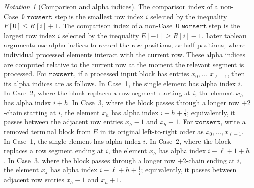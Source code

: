 \documentclass[11pt]{article}
\theoremstyle{plain}
\theoremstyle{definition}
\theoremstyle{remark}
\newtheorem*{notation}{Notation}
\newcommand{\rowsert}{\texttt{rowsert}}
\newcommand{\worsert}{\texttt{worsert}}
\begin{document}
\begin{notation}[Comparison and alpha indices]
The comparison index of a non-Case~0 \(\rowsert\) step is the smallest row
index \(i\) selected by the inequality \(F[0]\le R[i]+1\).  The comparison index
of a non-Case~0 \(\worsert\) step is the largest row index \(i\) selected by the
inequality \(E[-1]\ge R[i]-1\).
Later tableau arguments use alpha indices to record the row positions, or
half-positions, where individual processed elements interact with the current
row.  These alpha indices are computed relative to the current row at the
moment the relevant segment is processed.
For \(\rowsert\), if a processed input block has entries
\(x_0,\ldots,x_{\ell-1}\), then its alpha indices are as follows.  In Case~1,
the single element has alpha index \(i\).  In Case~2, where the block replaces a
row segment starting at \(i\), the element \(x_h\) has alpha index \(i+h\).  In
Case~3, where the block passes through a longer row \(+2\)-chain starting at
\(i\), the element \(x_h\) has alpha index \(i+h+\frac12\); equivalently, it
passes between the adjacent row entries \(x_h-1\) and \(x_h+1\).
For \(\worsert\), write a removed terminal block from \(E\) in its original
left-to-right order as \(x_0,\ldots,x_{\ell-1}\).  In Case~1, the single
element has alpha index \(i\).  In Case~2, where the block replaces a row
segment ending at \(i\), the element \(x_h\) has alpha index \(i-\ell+1+h\).  In
Case~3, where the block passes through a longer row \(+2\)-chain ending at
\(i\), the element \(x_h\) has alpha index \(i-\ell+h+\frac12\); equivalently,
it passes between adjacent row entries \(x_h-1\) and \(x_h+1\).
\end{notation}
\end{document}
